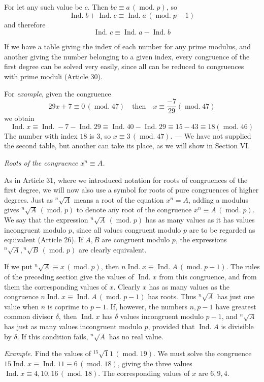 For let any such value be $c$. Then $bc\equiv a\,(\operatorname{mod.}p)$, so
\[\operatorname{Ind.}b+\operatorname{Ind.}c\equiv\operatorname{Ind.}a\,(\operatorname{mod.}p-1)\]
and therefore
\[\operatorname{Ind.}c\equiv\operatorname{Ind.}a-\operatorname{Ind.}b\]

If we have a table giving the index of each number for any prime modulus, and another giving the number belonging to a given index, every congruence of the first degree can be solved very easily, since all can be reduced to congruences with prime moduli (Article 30).

For \emph{example}, given the congruence
\[29x+7\equiv0\,(\operatorname{mod.}47)\quad\text{then}\quad x\equiv\frac{-7}{29}(\operatorname{mod.}47)\]
we obtain
\[\operatorname{Ind.}x\equiv\operatorname{Ind.}-7-\operatorname{Ind.}29\equiv\operatorname{Ind.}40-\operatorname{Ind.}29\equiv15-43\equiv18(\operatorname{mod.}46)\]
The number with index $18$ is $3$, so $x\equiv3\,(\operatorname{mod.}47)$. --- We have not supplied the second table, but another can take its place, as we will show in Section VI.

\begin{center}\emph{Roots of the congruence $x^n\equiv A$.}\end{center}

As in Article 31, where we introduced notation for roots of congruences of the first degree, we will now also use a symbol for roots of pure congruences of higher degrees. Just as ${}^{n}\!\surd A$ means a root of the equation $x^n=A$, adding a modulus gives ${}^{n}\!\surd A\,(\operatorname{mod.}p)$ to denote any root of the congruence $x^n\equiv A\,(\operatorname{mod.}p)$. We say that the expression ${}^{n}\!\surd A\,(\operatorname{mod.}p)$ has as many values as it has values incongruent modulo $p$, since all values congruent modulo $p$
are to be regarded as equivalent (Article 26). If $A,B$ are congruent modulo $p$, the expressions ${}^{n}\!\surd A,{}^{n}\!\surd B\,(\operatorname{mod.}p)$ are clearly equivalent.

If we put ${}^{n}\!\surd A\equiv x\,(\operatorname{mod.}p)$, then $n\operatorname{Ind.}x\equiv\operatorname{Ind.}A\,(\operatorname{mod.}p-1)$. The rules of the preceding section give the values of $\operatorname{Ind.}x$ from this congruence, and from them the corresponding values of $x$. Clearly $x$ has as many values as the congruence $n\operatorname{Ind.}x\equiv\operatorname{Ind.}A\,(\operatorname{mod.}p-1)$ has roots. Thus ${}^{n}\!\surd A$ has just one value when $n$ is coprime to $p-1$. If, however, the numbers $n,p-1$ have greatest common divisor $\delta$, then $\operatorname{Ind.}x$ has $\delta$ values incongruent modulo $p-1$, and ${}^{n}\!\surd A$ has just as many values incongruent modulo $p$, provided that $\operatorname{Ind.}A$ is divisible by $\delta$. If this condition fails, ${}^{n}\!\surd A$ has no real value.

\emph{Example.} Find the values of ${}^{15}\!\surd11\,(\operatorname{mod.}19)$. We must solve the congruence $15\operatorname{Ind.}x\equiv\operatorname{Ind.}11\equiv6\,(\operatorname{mod.}18)$, giving the three values $\operatorname{Ind.}x\equiv4,10,16\,(\operatorname{mod.}18)$. The corresponding values of $x$ are $6,9,4$.
